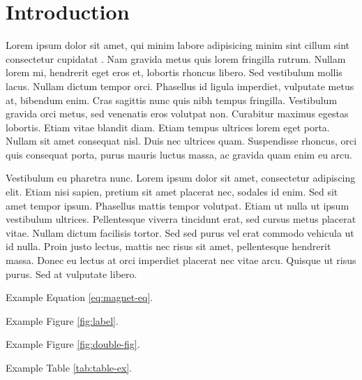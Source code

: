 \section*{Introduction}

Lorem ipsum dolor sit amet, qui minim labore adipisicing minim sint cillum sint
consectetur cupidatat \cite{citation}. Nam gravida metus quis lorem fringilla
rutrum. Nullam lorem mi, hendrerit eget eros et, lobortis rhoncus libero. Sed
vestibulum mollis lacus. Nullam dictum tempor orci. Phasellus id ligula
imperdiet, vulputate metus at, bibendum enim. Cras sagittis nunc quis nibh
tempus fringilla. Vestibulum gravida orci metus, sed venenatis eros volutpat
non. Curabitur maximus egestas lobortis. Etiam vitae blandit diam. Etiam tempus
ultrices lorem eget porta. Nullam sit amet consequat nisl. Duis nec ultrices
quam. Suspendisse rhoncus, orci quis consequat porta, purus mauris luctus massa,
ac gravida quam enim eu arcu.

Vestibulum eu pharetra nunc. Lorem ipsum dolor sit amet, consectetur adipiscing
elit. Etiam nisi sapien, pretium sit amet placerat nec, sodales id enim. Sed sit
amet tempor ipsum. Phasellus mattis tempor volutpat. Etiam ut nulla ut ipsum
vestibulum ultrices. Pellentesque viverra tincidunt erat, sed cursus metus
placerat vitae. Nullam dictum facilisis tortor. Sed sed purus vel erat commodo
vehicula ut id nulla. Proin justo lectus, mattis nec risus sit amet,
pellentesque hendrerit massa. Donec eu lectus at orci imperdiet placerat nec
vitae arcu. Quisque ut risus purus. Sed at vulputate libero.

Example Equation \ref{eq:magnet-eq}.


Example Figure \ref{fig:label}.


Example Figure \ref{fig:double-fig}.


Example Table \ref{tab:table-ex}.



